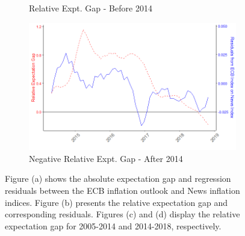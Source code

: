 \documentclass[review]{elsarticle}
\begin{document}
\begin{figure}[h!]
\begin{subfigure}{6cm}
    \caption{Relative Expt. Gap - Before 2014}
    \label{ECB_inf}
\end{subfigure}
\hfil
\begin{subfigure}{6cm}
    \includegraphics{rel_exp_res_aft2014.png}
    \caption{Negative Relative Expt. Gap - After 2014}
    \label{ECB_inf}
\end{subfigure}
\caption{Figure (a) shows the absolute expectation gap and regression residuals between the ECB inflation outlook and News inflation indices. Figure (b) presents the relative expectation gap and corresponding residuals. Figures (c) and (d) display the relative expectation gap for 2005-2014 and 2014-2018, respectively.}
\label{fig:Expectation Gap}
    \end{figure}


%
%
%
\end{document}
